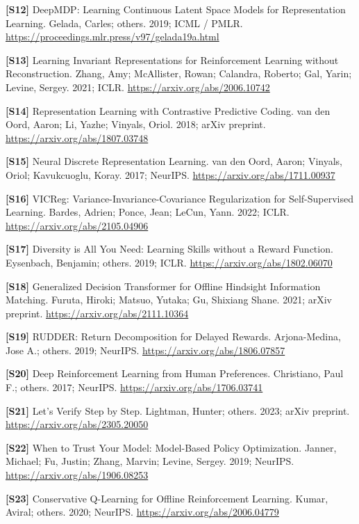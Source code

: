 \documentclass[
  11pt,
  a4paper,
]{article}
\begin{document}
\textbf{{[}S12{]}} DeepMDP: Learning Continuous Latent Space Models for
Representation Learning. Gelada, Carles; others. 2019; ICML / PMLR.
\url{https://proceedings.mlr.press/v97/gelada19a.html}

\textbf{{[}S13{]}} Learning Invariant Representations for Reinforcement
Learning without Reconstruction. Zhang, Amy; McAllister, Rowan;
Calandra, Roberto; Gal, Yarin; Levine, Sergey. 2021; ICLR.
\url{https://arxiv.org/abs/2006.10742}

\textbf{{[}S14{]}} Representation Learning with Contrastive Predictive
Coding. van den Oord, Aaron; Li, Yazhe; Vinyals, Oriol. 2018; arXiv
preprint. \url{https://arxiv.org/abs/1807.03748}

\textbf{{[}S15{]}} Neural Discrete Representation Learning. van den
Oord, Aaron; Vinyals, Oriol; Kavukcuoglu, Koray. 2017; NeurIPS.
\url{https://arxiv.org/abs/1711.00937}

\textbf{{[}S16{]}} VICReg: Variance-Invariance-Covariance Regularization
for Self-Supervised Learning. Bardes, Adrien; Ponce, Jean; LeCun, Yann.
2022; ICLR. \url{https://arxiv.org/abs/2105.04906}

\textbf{{[}S17{]}} Diversity is All You Need: Learning Skills without a
Reward Function. Eysenbach, Benjamin; others. 2019; ICLR.
\url{https://arxiv.org/abs/1802.06070}

\textbf{{[}S18{]}} Generalized Decision Transformer for Offline
Hindsight Information Matching. Furuta, Hiroki; Matsuo, Yutaka; Gu,
Shixiang Shane. 2021; arXiv preprint.
\url{https://arxiv.org/abs/2111.10364}

\textbf{{[}S19{]}} RUDDER: Return Decomposition for Delayed Rewards.
Arjona-Medina, Jose A.; others. 2019; NeurIPS.
\url{https://arxiv.org/abs/1806.07857}

\textbf{{[}S20{]}} Deep Reinforcement Learning from Human Preferences.
Christiano, Paul F.; others. 2017; NeurIPS.
\url{https://arxiv.org/abs/1706.03741}

\textbf{{[}S21{]}} Let's Verify Step by Step. Lightman, Hunter; others.
2023; arXiv preprint. \url{https://arxiv.org/abs/2305.20050}

\textbf{{[}S22{]}} When to Trust Your Model: Model-Based Policy
Optimization. Janner, Michael; Fu, Justin; Zhang, Marvin; Levine,
Sergey. 2019; NeurIPS. \url{https://arxiv.org/abs/1906.08253}

\textbf{{[}S23{]}} Conservative Q-Learning for Offline Reinforcement
Learning. Kumar, Aviral; others. 2020; NeurIPS.
\url{https://arxiv.org/abs/2006.04779}
\end{document}
